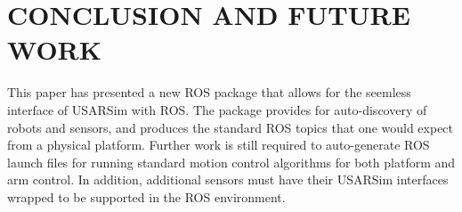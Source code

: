 \section*{CONCLUSION AND FUTURE WORK}\label{s:conclusion}
This paper has presented a new ROS package that allows for the seemless interface of USARSim with ROS. The package provides for auto-discovery of robots and sensors, and produces the standard ROS topics that one would expect from a physical platform. Further work is still required to auto-generate ROS launch files for running standard motion control algorithms for both platform and arm control. In addition, additional sensors must have their USARSim interfaces wrapped to be supported in the ROS environment.